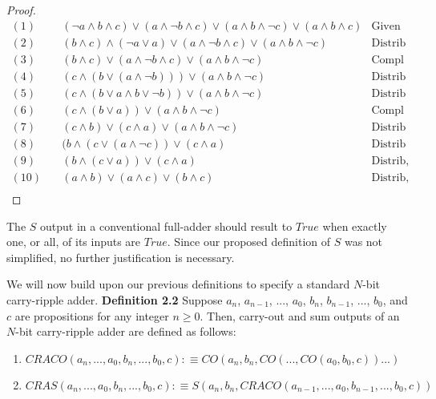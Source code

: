 \documentclass{article}
\begin{document}
\begin{proof}
	\begin{align*}
		(1) &  \quad (\lnot a \land b \land c) \lor (a \land \lnot b \land c) \lor (a \land b \land \lnot c) \lor (a \land b \land c) & \text{Given} \\
		(2) & \quad (b \land c) \land (\lnot a \lor a) \lor (a \land \lnot b \land c) \lor (a \land b \land \lnot c) & \text{Distrib} \\
		(3) & \quad (b \land c) \lor (a \land \lnot b \land c) \lor (a \land b \land \lnot c) & \text{Compl} \\
		(4) & \quad (c \land (b \lor (a \land \lnot b)))  \lor (a \land b \land \lnot c) & \text{Distrib} \\
		(5) & \quad (c \land (b \lor a \land b \lor \lnot b))  \lor (a \land b \land \lnot c) & \text{Distrib} \\
		(6) & \quad (c \land (b \lor a))  \lor (a \land b \land \lnot c) & \text{Compl} \\
		(7) & \quad (c \land b) \lor (c \land a) \lor (a \land b \land \lnot c) & \text{Distrib} \\
		(8) & \quad (b \land (c \lor (a \land \lnot c)) \lor (c \land a)  & \text{Distrib} \\
		(9) & \quad (b \land (c \lor a)) \lor (c \land a)  & \text{Distrib, Compl} \\
		(10) & \quad  (a \land b) \lor (a \land c) \lor (b \land c) & \text{Distrib, Commut} \\
	\end{align*}
\end{proof}

The $S$ output in a conventional full-adder should result to $True$ when exactly one, or all, of its inputs are $True$. Since our proposed definition of $S$ was not simplified, no further justification is necessary.

We will now build upon our previous definitions to specify a standard $N$-bit carry-ripple adder.
\newpage
\noindent \textbf{Definition 2.2} Suppose $a_n$, $a_{n-1}$, $...$, $a_0$, $b_n$, $b_{n-1}$, $...$, $b_0$, and $c$ are propositions for any integer $ n \geq 0$. Then, carry-out and sum outputs of an $N$-bit carry-ripple adder are defined as follows: 
\begin{enumerate}
	\item $ CRACO(a_n, ..., a_0, b_n, ..., b_0, c) :\equiv CO(a_n, b_n, CO(..., CO(a_0, b_0, c))...)$
	\item $ CRAS(a_n, ..., a_0, b_n, ..., b_0, c) :\equiv S(a_n, b_n, CRACO(a_{n-1}, ..., a_0, b_{n-1}, ..., b_0, c)) $
\end{enumerate}
\end{document}
